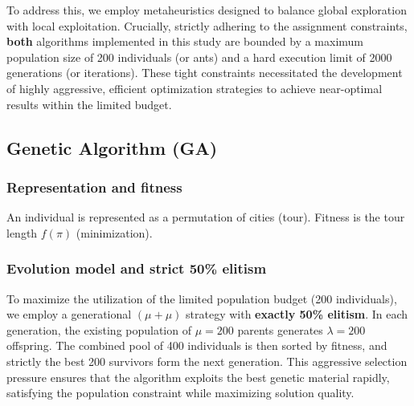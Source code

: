 \documentclass[11pt,a4paper]{article}
\begin{document}
To address this, we employ metaheuristics designed to balance global exploration with local exploitation. Crucially, strictly adhering to the assignment constraints, \textbf{both} algorithms implemented in this study are bounded by a maximum population size of 200 individuals (or ants) and a hard execution limit of 2000 generations (or iterations). These tight constraints necessitated the development of highly aggressive, efficient optimization strategies to achieve near-optimal results within the limited budget.

\subsection{Genetic Algorithm (GA)}
\subsubsection*{Representation and fitness}
An individual is represented as a permutation of cities (tour). Fitness is the tour length $f(\pi)$ (minimization).

\subsubsection*{Evolution model and strict 50\% elitism}
To maximize the utilization of the limited population budget (200 individuals), we employ a generational $(\mu+\mu)$ strategy with \textbf{exactly 50\% elitism}. In each generation, the existing population of $\mu=200$ parents generates $\lambda=200$ offspring. The combined pool of 400 individuals is then sorted by fitness, and strictly the best 200 survivors form the next generation. This aggressive selection pressure ensures that the algorithm exploits the best genetic material rapidly, satisfying the population constraint while maximizing solution quality.
\end{document}

